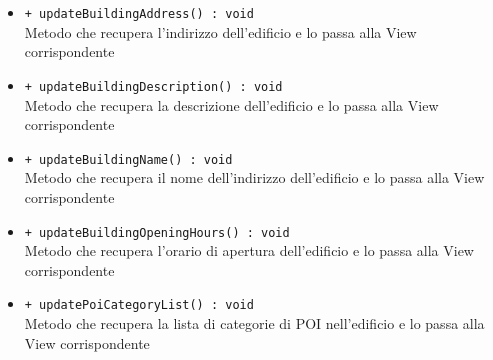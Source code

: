 \documentclass[../DefinizioneDiProdotto.tex]{subfiles}
\begin{document}
\begin{description}
\begin{itemize}
		\item \texttt{+ updateBuildingAddress() : void}\\
		Metodo che recupera l'indirizzo dell'edificio e lo passa alla View corrispondente
		\item \texttt{+ updateBuildingDescription() : void}\\
		Metodo che recupera la descrizione dell'edificio e lo passa alla View corrispondente
		\item \texttt{+ updateBuildingName() : void}\\
		Metodo che recupera il nome dell'indirizzo dell'edificio e lo passa alla View corrispondente
		\item \texttt{+ updateBuildingOpeningHours() : void}\\
		Metodo che recupera l'orario di apertura dell'edificio e lo passa alla View corrispondente
		\item \texttt{+ updatePoiCategoryList() : void}\\
		Metodo che recupera la lista di categorie di POI nell'edificio e lo passa alla View corrispondente
	\end{itemize}
\end{description}
\end{document}
